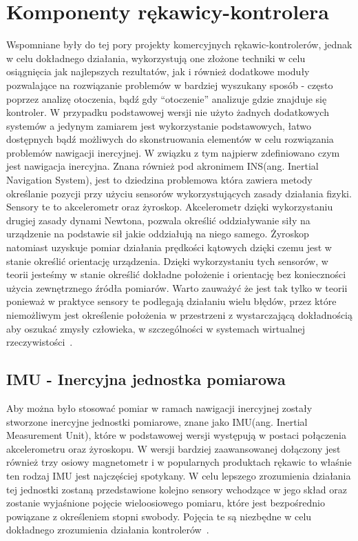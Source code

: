 \chapter{Komponenty rękawicy-kontrolera}
\label{ch:komponenty}
Wspomniane były do tej pory projekty komercyjnych rękawic-kontrolerów, jednak w celu dokładnego działania, wykorzystują one złożone techniki w celu osiągnięcia jak najlepszych rezultatów, jak i również dodatkowe moduły pozwalające na rozwiązanie problemów w bardziej wyszukany sposób - często poprzez analizę otoczenia, bądź gdy ``otoczenie'' analizuje gdzie znajduje się kontroler. W przypadku podstawowej wersji nie użyto żadnych dodatkowych systemów a jedynym zamiarem jest wykorzystanie podstawowych, łatwo dostępnych bądź możliwych do skonstruowania elementów w celu rozwiązania problemów nawigacji inercyjnej. W związku z tym najpierw zdefiniowano czym jest nawigacja inercyjna. Znana również pod akronimem INS(ang. Inertial Navigation System), jest to dziedzina problemowa która zawiera metody określanie pozycji przy użyciu sensorów wykorzystujących zasady działania fizyki. Sensory te to akcelerometr oraz żyroskop. Akcelerometr dzięki wykorzystaniu drugiej zasady dynami Newtona, pozwala określić oddziaływanie siły na urządzenie na podstawie sił jakie oddziałują na niego samego. Żyroskop natomiast uzyskuje pomiar działania prędkości kątowych dzięki czemu jest w stanie określić orientację urządzenia. Dzięki wykorzystaniu tych sensorów, w teorii jesteśmy w stanie określić dokładne położenie i orientację bez konieczności użycia zewnętrznego źródła pomiarów. Warto zauważyć że jest tak tylko w teorii ponieważ w praktyce sensory te podlegają działaniu wielu błędów, przez które niemożliwym jest określenie położenia w przestrzeni z wystarczającą dokładnością aby oszukać zmysły człowieka, w szczególności w systemach wirtualnej rzeczywistości~\cite{podstawy}.
		
	\section{IMU - Inercyjna jednostka pomiarowa}
	\label{sec:imu}
	Aby można było stosować pomiar w ramach nawigacji inercyjnej zostały stworzone inercyjne jednostki pomiarowe, znane jako IMU(ang. Inertial Measurement Unit), które w podstawowej wersji występują w postaci połączenia akcelerometru oraz żyroskopu. W wersji bardziej zaawansowanej dołączony jest również trzy osiowy magnetometr i w popularnych produktach rękawic to właśnie ten rodzaj IMU jest najczęściej spotykany. W celu lepszego zrozumienia działania tej jednostki zostaną przedstawione kolejno sensory wchodzące w jego skład oraz zostanie wyjaśnione pojęcie wieloosiowego pomiaru, które jest bezpośrednio powiązane z określeniem stopni swobody. Pojęcia te są niezbędne w celu dokładnego zrozumienia działania kontrolerów~\cite{bSensory}.
